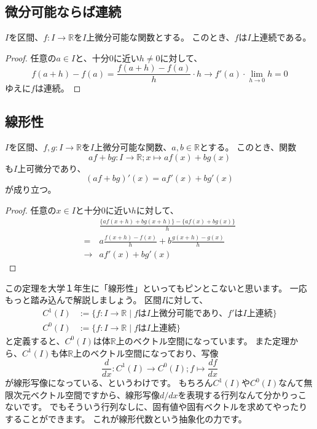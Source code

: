 \subsection{微分可能ならば連続}

\begin{theorem}
  $I$を区間、$f:I\to\mathbb{R}$を$I$上微分可能な関数とする。
  このとき、$f$は$I$上連続である。
\end{theorem}
\begin{proof}
  任意の$a\in I$と、十分0に近い$h\neq0$に対して、
  \[
    f(a+h)-f(a)=\frac{f(a+h)-f(a)}{h}\cdot h\to f'(a)\cdot\lim_{h\to0}h=0
  \]
  ゆえに$f$は連続。
\end{proof}

\subsection{線形性}

\begin{theorem}
  $I$を区間、$f,g:I\to\mathbb{R}$を$I$上微分可能な関数、$a,b\in\mathbb{R}$とする。
  このとき、関数
  \[
    af+bg:I\to\mathbb{R};x\mapsto af(x)+bg(x)
  \]
  も$I$上可微分であり、
  \[
    (af+bg)'(x)=af'(x)+bg'(x)
  \]
  が成り立つ。
\end{theorem}
\begin{proof}
  任意の$x\in I$と十分0に近い$h$に対して、
  \begin{align*}
    &\frac{\{af(x+h)+bg(x+h)\}-\{af(x)+bg(x)\}}{h}\\
    =&a\frac{f(x+h)-f(x)}{h}+b\frac{g(x+h)-g(x)}{h}\\
    \to&af'(x)+bg'(x)
  \end{align*}
\end{proof}

この定理を大学１年生に「線形性」といってもピンとこないと思います。
一応もっと踏み込んで解説しましょう。
区間$I$に対して、
\begin{align*}
  C^1(I)&:=\{f:I\to\mathbb{R}\mid\text{$f$は$I$上微分可能であり、$f'$は$I$上連続}\}\\
  C^0(I)&:=\{f:I\to\mathbb{R}\mid\text{$f$は$I$上連続}\}
\end{align*}
と定義すると、$C^0(I)$は体$\mathbb{R}$上のベクトル空間になっています。
また定理から、$C^1(I)$も体$\mathbb{R}$上のベクトル空間になっており、写像
\[
  \frac{d}{dx}:C^1(I)\to C^0(I);f\mapsto\frac{df}{dx}
\]
が線形写像になっている、というわけです。
もちろん$C^1(I)$や$C^0(I)$なんて無限次元ベクトル空間ですから、線形写像$d/dx$を表現する行列なんて分かりっこないです。
でもそういう行列なしに、固有値や固有ベクトルを求めてやったりすることができます。
これが線形代数という抽象化の力です。


